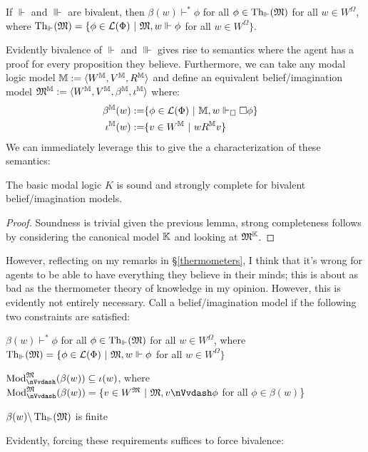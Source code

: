 \begin{corollary}
  If $\Vdash$ and $\Vvdash$ are bivalent, then $\beta (w) \vdash^{\ast} \phi$
  for all $\phi \in \tmop{Th}_{\Vdash} (\Omega)$ for all $w \in W^{\Omega}$,
  where $\tmop{Th}_{\Vdash} (\Omega) =\{\phi \in \mathcal{L} (\Phi)
  \  | \  \Omega, w \Vdash \phi$ for all $w \in W^{\Omega}
  \}$.
\end{corollary}

Evidently bivalence of $\Vdash$ and $\Vvdash$ gives rise to semantics where
the agent has a proof for every proposition they believe.   Furthermore, we
can take any modal logic model $\mathbbm{M} \assign \langle W^{\mathbbm{M}},
V^{\mathbbm{M}}, R^{\mathbbm{M}} \rangle$ and define an equivalent
belief/imagination model $\Omega^{\mathbbm{M}} \assign \langle
W^{\mathbbm{M}}, V^{\mathbbm{M}}, \beta^{\mathbbm{M}}, \iota^{\mathbbm{M}}
\rangle$ where:
\begin{eqnarray}
  \beta^{\mathbbm{M}} (w) \assign & \{\phi \in \mathcal{L} (\Phi) \ 
  | \  \mathbbm{M}, w \Vdash_{\Box} \Box \phi\} &  \nonumber\\
  \iota^{\mathbbm{M}} (w) \assign & \{v \in W^{\mathbbm{M}} \  |
  \  w R^{\mathbbm{M}} v\} &  \nonumber
\end{eqnarray}
We can immediately leverage this to give the a characterization of these
semantics:

\begin{proposition}
  The basic modal logic $K$ is sound and strongly complete for bivalent
  belief/imagination models.
\end{proposition}

\begin{proof}
  Soundness is trivial given the previous lemma, strong completeness follows
  by considering the canonical model $\mathbbm{K}$ and looking at
  $\Omega^{\mathbbm{K}}$. 
\end{proof}

However, reflecting on my remarks in \S\ref{thermometers}, I think that it's wrong for agents to be able to have
everything they believe in their minds; this is about as bad as the thermometer theory of knowledge
 in my opinion.   However, this is evidently not entirely necessary. Call a belief/imagination model
\tmtextit{reasonable} if the following two constraints are satisfied:
\begin{itemizedot}
  \item $\beta (w) \vdash^{\ast} \phi$ for all $\phi \in \tmop{Th}_{\Vdash}
  (\Omega)$ for all $w \in W^{\Omega}$, where $\tmop{Th}_{\Vdash} (\Omega)
  =\{\phi \in \mathcal{L} (\Phi) \  | \  \Omega, w \Vdash
  \phi$ for all $w \in W^{\Omega} \}$
  
  \item $\tmop{Mod}^{\Omega}_{{\nVvdash}} (\beta (w)) \subseteq \iota (w)$,
  where $\tmop{Mod}^{\Omega}_{{\nVvdash}} (\beta (w)) =\{v \in W^{\Omega}
  \  | \  \Omega, v {\nVvdash} \phi$ for all $\phi \in
  \beta (w)$\}
  
  \item $\beta (w) \backslash \tmop{Th}_{\Vdash} (\Omega)$ is finite
\end{itemizedot}
Evidently, forcing these requirements suffices to force bivalence:

